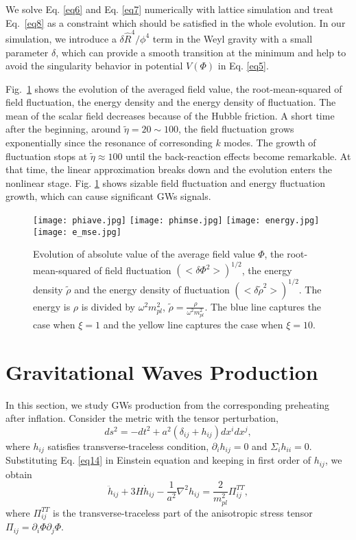 \documentclass[12pt, a4paper]{article}
\begin{document}
We solve Eq. \ref{eq6} and Eq. \ref{eq7} numerically with lattice simulation and treat Eq.~\ref{eq8} as a constraint which should be satisfied in the whole evolution. In our simulation, we introduce a ${\delta}\hat{R}^4/{\phi^4}$ term in the Weyl gravity with a small parameter ${\delta}$, which can provide a smooth transition at the minimum and help to avoid the singularity behavior in potential $V\left(\Phi\right)$ in Eq. \ref{eq5}.

Fig.~\ref{fig:fig3} shows the evolution of the averaged field value, the root-mean-squared of field fluctuation, the energy density and the energy density of fluctuation. The mean of the scalar field decreases because of the Hubble friction. A short time after the beginning, around $\tilde{\eta}=20  \sim 100$, the field fluctuation grows exponentially since the resonance of corresonding $k$ modes. The growth of fluctuation stops at $\tilde{\eta}\approx 100$  until the back-reaction effects become remarkable. At that time, the linear approximation breaks down and the evolution enters the nonlinear stage. Fig. \ref{fig:fig3} shows sizable field fluctuation and energy fluctuation growth, which can cause significant GWs signals.
 \begin{figure}[t]
  \centering

    \texttt{[image: phiave.jpg]}
    \texttt{[image: phimse.jpg]}
    \texttt{[image: energy.jpg]}
    \texttt{[image: e\_mse.jpg]}

  \caption{Evolution of absolute value of the average field value $\Phi$, the root-mean-squared of field fluctuation $\left(<\delta\Phi^2>\right)^{1/2}$, the energy density $\tilde{\rho}$ and the energy density of fluctuation $\left(<\delta\tilde{\rho}^2>\right)^{1/2}$.
   The energy is $\rho$ is divided by $\omega^2m_{pl}^2$, $\tilde{\rho}=\frac{\rho}{\omega^2m_{pl}^2}$. The blue line captures the case when 
   $\xi=1$ and the yellow line captures the case when $\xi=10$.} 
  \label{fig:fig3}
\end{figure}

\section{Gravitational Waves Production}\label{section:C}

In this section, we study GWs production from the corresponding preheating after inflation. Consider the  metric with
 the tensor perturbation,
 \begin{equation}
  \label{eq14}
  ds^2=-dt^2+a^2\left(\delta_{ij}+h_{ij}\right)dx^i dx^j,
 \end{equation}
where $h_{ij}$ satisfies transverse-traceless condition, $\partial_ih_{ij}=0$ and $\Sigma_i h_{ii}=0$. Substituting Eq. \ref{eq14} in Einstein equation and keeping in 
first order of $h_{ij}$, we obtain
\begin{equation}
  \label{eq15}
  \ddot{h}_{ij}+3H\dot{h}_{ij}-\frac{1}{a^2}\nabla^2 h_{ij}=\frac{2}{m^2_{pl}}\Pi_{ij}^{TT},
\end{equation}
where $\Pi_{ij}^{TT}$ is the transverse-traceless part of the anisotropic stress tensor $\Pi_{ij}=\partial_i\Phi\partial_j\Phi$.
\end{document}
